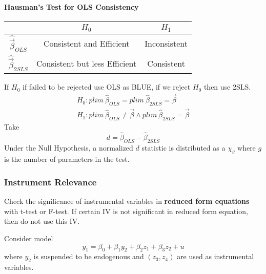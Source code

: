 \documentclass[]{article}
\begin{document}
			\paragraph{Hausman's Test for OLS Consistency}
			\begin{figure*}
				\centering
				\begin{tabular}{|c|c|c|}
					\hline
					& $H_0$ & $H_1$ \\
					\hline
					$\hat{\vec{\beta}}_{OLS}$ & Consistent and Efficient & Inconsistent \\
					\hline
					$\hat{\vec{\beta}}_{2SLS}$ & Consistent but less Efficient & Consistent \\
					\hline
				\end{tabular}
			\end{figure*}
			\par If $H_0$ if failed to be rejected use OLS as BLUE, if we reject $H_0$ then use 2SLS.
			\begin{gather*}
				H_0: plim\ \hat{\beta}_{OLS} = plim\ \hat{\beta}_{2SLS} = \vec{\beta} \\
				H_1: plim\ \hat{\beta}_{OLS} \neq \vec{\beta} \land plim\ \hat{\beta}_{2SLS} = \vec{\beta}
			\end{gather*}
			Take 
			\[
				d = \hat{\beta}_{OLS} - \hat{\beta}_{2SLS}
			\]
			Under the Null Hypothesis, a normalized $d$ statistic is distributed as a $\chi_g$ where $g$ is the number of parameters in the test.
			
		\subsubsection{Instrument Relevance}
			\par Check the significance of instrumental variables in \textbf{reduced form equations} with t-test or F-test. If certain IV is not significant in reduced form equation, then do not use this IV.
			\par Consider model
			\begin{equation}
				y_1 = \beta_0 + \beta_1 y_2 + \beta_2 z_1 + \beta_3 z_2 + u
			\end{equation}
			where $y_2$ is suspended to be endogenous and $(z_3, z_4)$ are used as instrumental variables.
\end{document}
